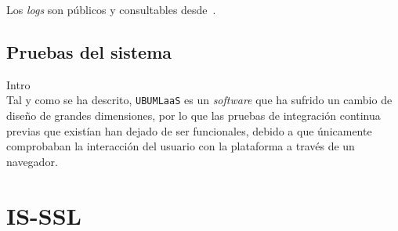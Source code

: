 Los \textit{logs} son públicos y consultables desde~\cite{Travis-CI-LOG-UBUMLaaS}.


\subsection{Pruebas del sistema}
Intro \\
Tal y como se ha descrito, \texttt{UBUMLaaS} es un \textit{software} que ha sufrido un cambio de diseño de grandes dimensiones, por lo que las pruebas de integración continua previas que existían han dejado de ser funcionales, debido a que únicamente comprobaban la interacción del usuario con la plataforma a través de un navegador.

\clearpage
\section{IS-SSL}

